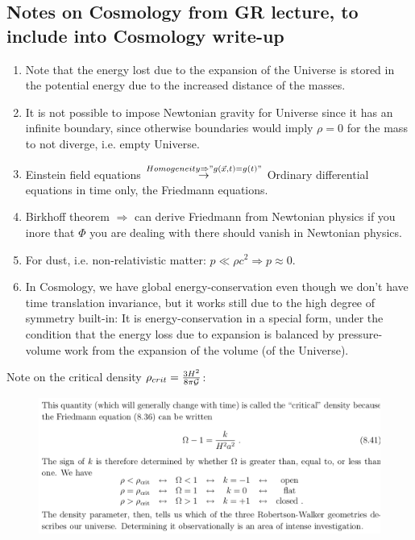 \subsection{Notes on Cosmology from GR lecture, to include into Cosmology write-up}
\begin{enumerate}
	\item Note that the energy lost due to the expansion of the Universe is stored in the potential energy due to the increased distance of the masses.
	\item It is not possible  to impose Newtonian gravity for Universe since it has an infinite boundary, since otherwise boundaries would imply $\rho = 0$ for the mass to not diverge, i.e. empty Universe.
	\item Einstein field equations $\stackrel{Homogeneity\Rightarrow"g(\vec{x},t)=g(t)"}{\rightarrow}$ Ordinary differential equations in time only, the Friedmann equations.
	\item Birkhoff theorem $\Rightarrow$ can derive Friedmann from Newtonian physics if you inore that $\Phi$ you are dealing with there should vanish in Newtonian physics.
	\item For dust, i.e. non-relativistic matter: $p \ll \rho c^2 \Rightarrow p \approx 0$.
	\item In Cosmology, we have global energy-conservation even though we don't have time translation invariance, but it works still due to the high degree of symmetry built-in: It is energy-conservation in a special form, under the condition that the energy loss due to expansion is balanced by pressure-volume work from the expansion of the volume (of the Universe).
\end{enumerate}
Note on the critical density $\rho_{crit}=\frac{3H^2}{8\pi \mathcal{G}}$:
\begin{figure}[h!]
	\centering
	\includegraphics[width=0.7\linewidth]{gfx/criticaldensityCosomology}
	\caption{}
	\label{fig:criticaldensitycosomology}
\end{figure}

